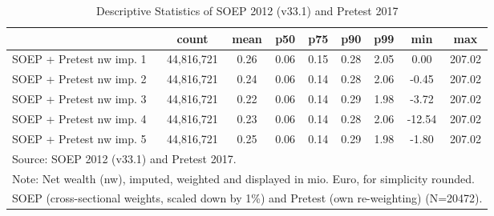 \begin{table}[htbp]\centering
\def\sym#1{\ifmmode^{#1}\else\(^{#1}\)\fi}
\caption{Descriptive Statistics of SOEP 2012 (v33.1) and Pretest 2017}
\begin{tabular}{l*{1}{cccccccc}}
\hline\hline
                                            &       count&        mean&         p50&         p75&         p90&         p99&         min&         max\\
\hline
SOEP + Pretest nw imp. 1                    &  44,816,721&        0.26&        0.06&        0.15&        0.28&        2.05&        0.00&      207.02\\
SOEP + Pretest nw imp. 2                    &  44,816,721&        0.24&        0.06&        0.14&        0.28&        2.06&       -0.45&      207.02\\
SOEP + Pretest nw imp. 3                    &  44,816,721&        0.22&        0.06&        0.14&        0.29&        1.98&       -3.72&      207.02\\
SOEP + Pretest nw imp. 4                    &  44,816,721&        0.23&        0.06&        0.14&        0.28&        2.06&      -12.54&      207.02\\
SOEP + Pretest nw imp. 5                    &  44,816,721&        0.25&        0.06&        0.14&        0.29&        1.98&       -1.80&      207.02\\
\hline\hline
\multicolumn{9}{l}{\footnotesize Source: SOEP 2012 (v33.1) and Pretest 2017.}\\
\multicolumn{9}{l}{\footnotesize Note: Net wealth (nw), imputed, weighted and displayed in mio. Euro, for simplicity rounded.}\\
\multicolumn{9}{l}{\footnotesize SOEP (cross-sectional weights, scaled down by 1\%) and Pretest (own re-weighting) (N=20472).}\\
\end{tabular}
\end{table}
